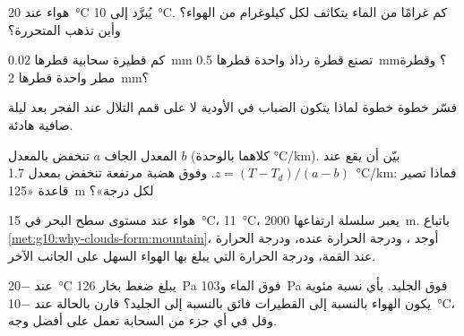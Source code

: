\begin{exercise}[$\star\star$]\label{exo:g10:why-clouds-form:9}
هواء  عند \qty{20}{\degreeCelsius} يُبرَّد إلى
\qty{10}{\degreeCelsius}. كم غرامًا من الماء يتكاثف لكل كيلوغرام من
الهواء؟ وأين تذهب  المتحررة؟
\end{exercise}

\begin{exercise}[$\star\star$]\label{exo:g10:why-clouds-form:10}
كم قطيرة سحابية قطرها \qty{0.02}{mm} تصنع قطرة رذاذ واحدة
قطرها \qty{0.5}{mm}؟ وقطرة مطر واحدة قطرها \qty{2}{mm}؟
\end{exercise}

\begin{exercise}[$\star\star$]\label{exo:g10:why-clouds-form:11}
فسّر خطوة خطوة لماذا يتكون الضباب في الأودية لا على قمم التلال عند الفجر بعد
ليلة صافية هادئة.
\end{exercise}

\begin{exercise}[$\star\star\star$]\label{exo:g10:why-clouds-form:12}
المعدل الجاف $a$  تنخفض بالمعدل $b$ (كلاهما بالوحدة
\unit{\degreeCelsius/km}). بيّن أن  يقع عند
$z = (T - T_d)/(a - b)$. وفوق هضبة مرتفعة تنخفض  بمعدل
\qty{1.7}{\degreeCelsius/km}: فماذا تصير قاعدة «\qty{125}{m} لكل
درجة»؟
\end{exercise}

\begin{exercise}[$\star\star\star$]\label{exo:g10:why-clouds-form:13}
هواء عند مستوى سطح البحر في \qty{15}{\degreeCelsius}، 
\qty{11}{\degreeCelsius}، يعبر سلسلة ارتفاعها \qty{2000}{m}. باتباع
\cref{met:g10:why-clouds-form:mountain}، أوجد ، ودرجة
الحرارة عنده، ودرجة الحرارة عند القمة، ودرجة الحرارة التي يبلغ بها الهواء السهل
على الجانب الآخر.
\end{exercise}

\begin{exercise}[$\star\star\star$]\label{exo:g10:why-clouds-form:14}
عند \qty{-20}{\degreeCelsius} يبلغ ضغط بخار 
\qty{126}{Pa} فوق الماء و\qty{103}{Pa} فوق الجليد. بأي نسبة مئوية يكون الهواء
 بالنسبة إلى القطيرات فائق  بالنسبة إلى الجليد؟ قارن بالحالة عند
\qty{-10}{\degreeCelsius}، وقل في أي جزء من السحابة تعمل 
على أفضل وجه.
\end{exercise}

